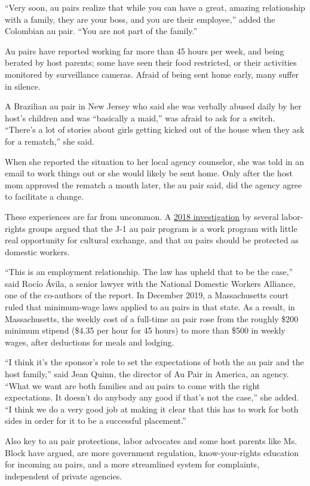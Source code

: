 ``Very soon, au pairs realize that while you can have a great, amazing
relationship with a family, they are your boss, and you are their
employee,'' added the Colombian au pair. ``You are not part of the
family.''

Au pairs have reported working far more than 45 hours per week, and
being berated by host parents; some have seen their food restricted, or
their activities monitored by surveillance cameras. Afraid of being sent
home early, many suffer in silence.

A Brazilian au pair in New Jersey who said she was verbally abused daily
by her host's children and was ``basically a maid,'' was afraid to ask
for a switch. ``There's a lot of stories about girls getting kicked out
of the house when they ask for a rematch,'' she said.

When she reported the situation to her local agency counselor, she was
told in an email to work things out or she would likely be sent home.
Only after the host mom approved the rematch a month later, the au pair
said, did the agency agree to facilitate a change.

These experiences are far from uncommon. A
\href{https://cdmigrante.org/wp-content/uploads/2018/08/Shortchanged.pdf}{2018
investigation} by several labor-rights groups argued that the J-1 au
pair program is a work program with little real opportunity for cultural
exchange, and that au pairs should be protected as domestic workers.

``This is an employment relationship. The law has upheld that to be the
case,'' said Rocío Ávila, a senior lawyer with the National Domestic
Workers Alliance, one of the co-authors of the report. In December 2019,
a Massachusetts court ruled that minimum-wage laws applied to au pairs
in that state. As a result, in Massachusetts, the weekly cost of a
full-time au pair rose from the roughly \$200 minimum stipend (\$4.35
per hour for 45 hours) to more than \$500 in weekly wages, after
deductions for meals and lodging.

``I think it's the sponsor's role to set the expectations of both the au
pair and the host family,'' said Jean Quinn, the director of Au Pair in
America, an agency. ``What we want are both families and au pairs to
come with the right expectations. It doesn't do anybody any good if
that's not the case,'' she added. ``I think we do a very good job at
making it clear that this has to work for both sides in order for it to
be a successful placement.''

Also key to au pair protections, labor advocates and some host parents
like Ms. Block have argued, are more government regulation,
know-your-rights education for incoming au pairs, and a more streamlined
system for complaints, independent of private agencies.

